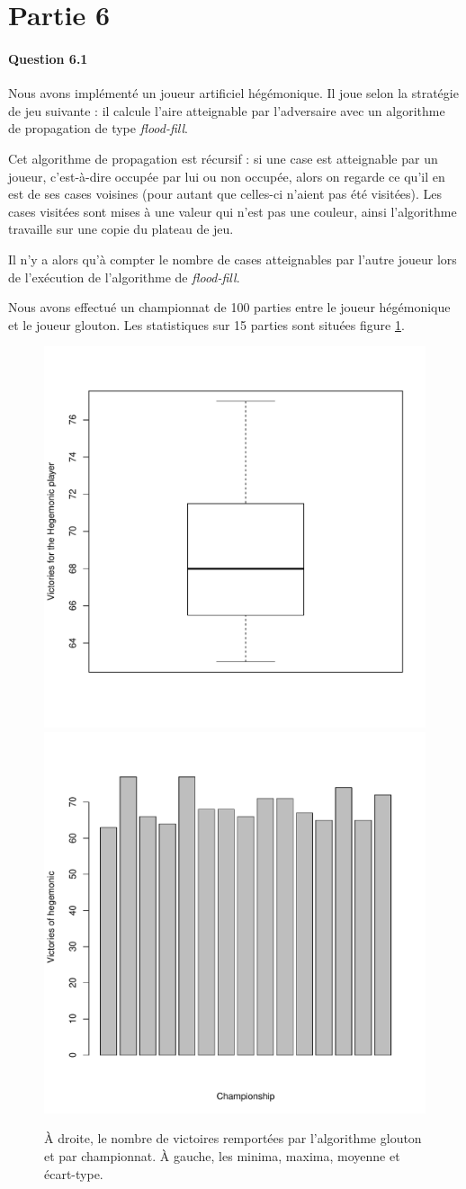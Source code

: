\documentclass[a4paper]{article}
\begin{document}
    \section{Partie 6}
    \paragraph{Question 6.1}
    Nous avons implémenté un joueur artificiel hégémonique. Il joue selon la 
stratégie de jeu suivante : il calcule l'aire atteignable par l'adversaire avec
un algorithme de propagation de type \emph{flood-fill}.

Cet algorithme de propagation est récursif : si une case est atteignable par un 
joueur, c'est-à-dire occupée par lui ou non occupée, alors on regarde ce qu'il 
en est de ses cases voisines (pour autant que celles-ci n'aient pas été 
visitées). Les cases visitées sont mises à une valeur qui n'est pas une 
couleur, ainsi l'algorithme travaille sur une copie du plateau de jeu.

Il n'y a alors qu'à compter le nombre de cases atteignables par l'autre joueur 
lors de l'exécution de l'algorithme de \emph{flood-fill}.

Nous avons effectué un championnat de 100 parties entre le joueur hégémonique 
et le joueur glouton. Les statistiques sur 15 parties sont situées figure 
\ref{hegemon_greedy}.


\begin{figure}
\centering

\includegraphics[width=.45\columnwidth]{hegemon_vs_greedy}
\includegraphics[width=.45\columnwidth]{hegemon_vs_greedy_bar}

\caption{\label{hegemon_greedy} À droite, le nombre de victoires remportées par 
l'algorithme glouton et par championnat. À gauche, les minima, maxima, moyenne 
et écart-type.}
\end{figure}
\end{document}
